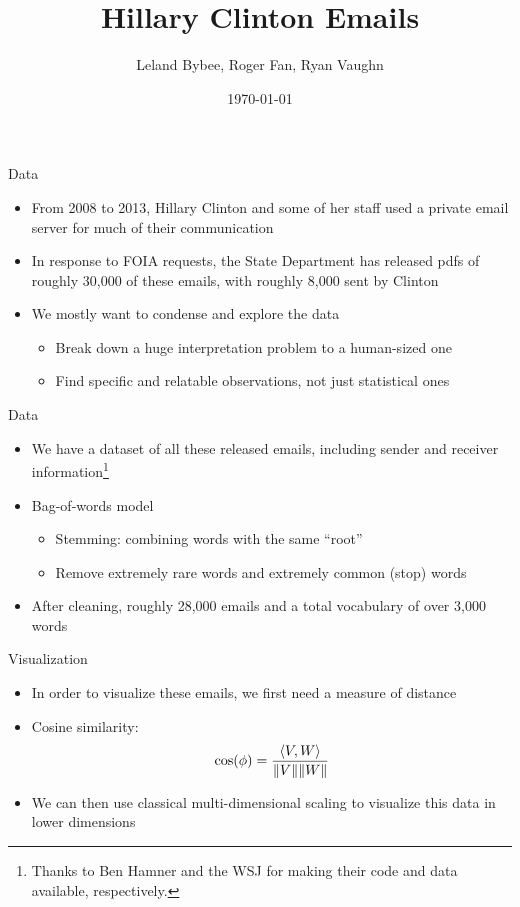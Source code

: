 \documentclass[handout,13pt]{beamer}
\title[601 Final Project]{Hillary Clinton Emails}
\author[Leland Bybee, Roger Fan, Ryan Vaughn]{Leland Bybee, Roger Fan, Ryan Vaughn}
\date{\today}
\DeclarePairedDelimiter{\norm}{\lVert}{\rVert}
\begin{document}
\begin{frame}
\maketitle
\end{frame}


\begin{frame}{Data}
\begin{itemize}
\item From 2008 to 2013, Hillary Clinton and some of her staff used a private email server for much of their communication
\item In response to FOIA requests, the State Department has released pdfs of roughly 30,000 of these emails, with roughly 8,000 sent by Clinton
\item We mostly want to condense and explore the data
  \begin{itemize}
  \item Break down a huge interpretation problem to a human-sized one
  \item Find specific and relatable observations, not just statistical ones
  \end{itemize}
\end{itemize}
\end{frame}


\begin{frame}{Data}
\begin{itemize}
\item We have a dataset of all these released emails, including sender and receiver information\footnote{Thanks to Ben Hamner and the WSJ for making their code and data available, respectively.}
\pause\item Bag-of-words model
  \begin{itemize}
  \item Stemming: combining words with the same ``root''
  \item Remove extremely rare words and extremely common (stop) words
  \end{itemize}
\item After cleaning, roughly 28,000 emails and a total vocabulary of over 3,000 words
\end{itemize}
\end{frame}


\begin{frame}{Visualization}
\begin{itemize}
\item In order to visualize these emails, we first need a measure of distance
\item Cosine similarity:
  \begin{equation*}
  \cos(\phi) = \frac{\langle V, W \rangle}{\norm{V}\norm{W}}
  \end{equation*}
\item We can then use classical multi-dimensional scaling to visualize this data in lower dimensions
\end{itemize}
\end{frame}
\end{document}
